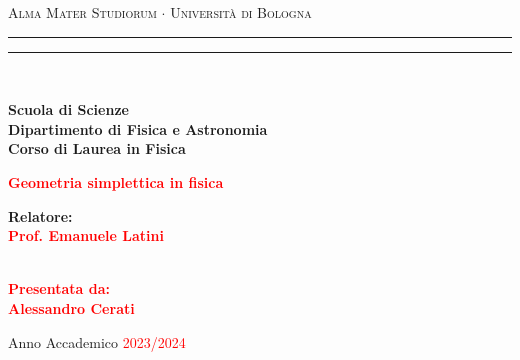 \documentclass[%
  libro,          
  corpo=12pt,        %
  tipotesi=custom, %
  draft
]{toptesi}
\begin{document}
\begin{titlepage}
  \begin{center}
  {{\Large{\textsc{Alma Mater Studiorum $\cdot$ Università di Bologna}}}} 
  \rule[0.1cm]{\textwidth}{0.1mm}
  \rule[0.5cm]{\textwidth}{0.6mm}
  \\\vspace{3mm}
  
  {\small{\bf Scuola di Scienze \\ 
  Dipartimento di Fisica e Astronomia\\
  Corso di Laurea in Fisica}}
  
  \end{center}
  
  \vspace{23mm}
  
  \begin{center}\textcolor{red}{
  {\LARGE{\bf Geometria simplettica in fisica}}\\
  }\end{center}
  
  \vspace{50mm} \par \noindent
  
  \begin{minipage}[t]{0.47\textwidth}
  {\large{\bf Relatore: \vspace{2mm}\\\textcolor{red}{
  Prof. Emanuele Latini}}}\\\\

  \end{minipage}
  \hfill
  \begin{minipage}[t]{0.47\textwidth}\raggedleft \textcolor{red}{
  {\large{\bf Presentata da:
  \vspace{2mm}\\
  Alessandro Cerati}}}
  \end{minipage}
  
  \vspace{40mm}
  
  \begin{center}
  Anno Accademico \textcolor{red}{ 2023/2024}
  \end{center}
  
  \end{titlepage}
  
\end{document}
